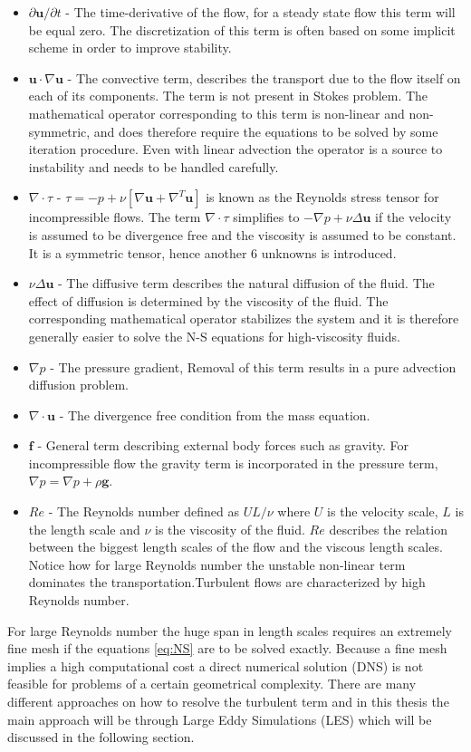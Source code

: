 \begin{itemize}
    \item $\partial \mathbf{u} /\partial t$
     - The time-derivative of the flow, for a steady state flow this term will be equal zero.
             The discretization of this term is often based on some implicit scheme in order to improve stability.  
    \item $\mathbf{u} \cdot \nabla \mathbf{u}$
     - The convective term, describes the transport due to the flow itself on each of its components. 
    The term is not present in Stokes problem.
    The mathematical operator corresponding to this term is non-linear and non-symmetric, and does therefore require the equations to be solved 
    by some iteration procedure. Even with linear advection the operator is a source to instability and needs to be handled carefully. 
\item  $\nabla \cdot \tau$ 
       - $\tau= -p + \nu[ \nabla \mathbf{u} + \nabla^T \mathbf{u}]$ is known as the Reynolds stress tensor for incompressible flows.
       The term $\nabla \cdot \tau$ simplifies to $-\nabla p + \nu \Delta \mathbf{u}$ if the velocity is assumed to 
       be divergence free and the viscosity is assumed to be constant. 
       It is a symmetric tensor, hence another 6 unknowns is introduced.
    \item $\nu \Delta \mathbf{u}$ 
    - The diffusive term describes the natural diffusion of the fluid. The effect of diffusion is determined by the 
    viscosity of the fluid. The corresponding mathematical operator stabilizes the system and it is therefore generally easier
    to solve the N-S equations for high-viscosity fluids. 
    \item $\nabla p$
    - The pressure gradient, Removal of this term results in a pure advection diffusion problem.
    \item $\nabla \cdot \mathbf{u}$ 
    - The divergence free condition from the mass equation.
\item $\mathbf{f}$ 
    - General term describing external body forces such as gravity. For incompressible flow the
    gravity term is incorporated in the pressure term, $\nabla p = \nabla p + \rho \mathbf{g}$. 
    \item $Re$ 
    - The Reynolds number defined as $UL/\nu$ where $U$ is the velocity scale, $L$ is the length scale and $\nu$ 
      is the viscosity of the fluid. $Re$ describes the relation between the biggest length scales of the flow
      and the viscous length scales. Notice how for large Reynolds number the unstable non-linear term 
      dominates the transportation.Turbulent flows are characterized by high Reynolds number.
\end{itemize}
For large Reynolds number the huge span in length scales requires an extremely fine mesh if the equations \ref{eq:NS} 
are to be solved exactly. Because a fine mesh implies a high computational cost a direct numerical solution (DNS) is not feasible for 
problems of a certain geometrical complexity. There are many different approaches on how to resolve the turbulent term and in 
this thesis the main approach will be through Large Eddy Simulations (LES) which will be discussed 
in the following section.
%
